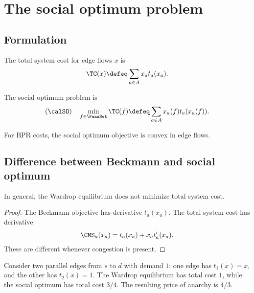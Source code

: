 
\section{The social optimum problem}

\subsection{Formulation}


\begin{definition}
The total system cost for edge flows $x$ is
\[
\TC(x) \defeq \sum_{a \in A} x_a t_a(x_a).
\]
\end{definition}

\begin{definition}\label{def:social_optimum}
The social optimum problem is
\[
(\calSO) \quad \min_{f \in \FeasSet}\TC(f)
\defeq \sum_{a \in A}x_a(f)t_a(x_a(f)).
\]
\end{definition}

\begin{proposition}\label{prop:so_convex}
For BPR costs, the social optimum objective is convex in edge flows.
\end{proposition}

\subsection{Difference between Beckmann and social optimum}

\begin{proposition}\label{prop:ue_ne_so}
In general, the Wardrop equilibrium does not minimize total system cost.
\end{proposition}

\begin{proof}
The Beckmann objective has derivative $t_a(x_a)$. The total system cost has derivative
\[
\CMS_a(x_a) = t_a(x_a) + x_a t_a'(x_a).
\]
These are different whenever congestion is present.
\end{proof}

\begin{example}\label{ex:pigou}
Consider two parallel edges from $s$ to $d$ with demand $1$: one edge has $t_1(x)=x$, and the other has $t_2(x)=1$. The Wardrop equilibrium has total cost $1$, while the social optimum has total cost $3/4$. The resulting price of anarchy is $4/3$.
\end{example}

